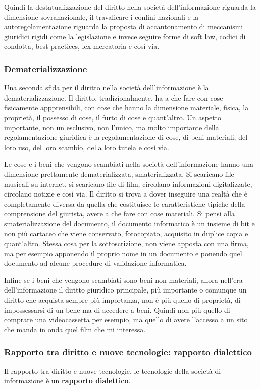 Quindi la destatualizzazione del diritto nella società dell'informazione riguarda la dimensione sovranazionale, il travalicare i confini nazionali e la autoregolamentazione riguarda la proposta di accantonamento di meccanismi giuridici rigidi come la legislazione e invece seguire forme di soft law, codici di condotta, best practices, lex mercatoria e così via.

\subsubsection{Dematerializzazione}
Una seconda sfida per il diritto nella società dell'informazione è la dematerializzazione. 
Il diritto, tradizionalmente, ha a che fare con cose fisicamente appprensibili, con cose che hanno la dimensione materiale, fisica, la proprietà, il possesso di cose, il furto di cose e quant'altro. Un aspetto importante, non un esclusivo, non l'unico, ma molto importante della regolamentazione giuridica è la regolamentazione di cose, di beni materiali, del loro uso, del loro scambio, della loro tutela e così via. 

Le cose e i beni che vengono scambiati nella società dell'informazione hanno una dimensione prettamente dematerializzata, smaterializzata. Si scaricano file musicali su internet, si scaricano file di film, circolano informazioni digitalizzate, circolano notizie e così via. Il diritto si trova a dover inseguire una realtà che è completamente diversa da quella che costituisce le caratteristiche tipiche della comprensione del giurista, avere a che fare con cose materiali. Si pensi alla smaterializzazione del documento, il documento informatico è un insieme di bit e non più cartaceo che viene conservato, fotocopiato, acquisito in duplice copia e quant'altro. Stessa cosa per la sottoscrizione, non viene apposta con una firma, ma per esempio apponendo il proprio nome in un documento e ponendo quel documento ad alcune procedure di validazione informatica. 

Infine se i beni che vengono scambiati sono beni non materiali, allora nell'era dell'informazione il diritto giuridico principale, più importante o comunque un diritto che acquista sempre più importanza, non è più quello di proprietà, di impossessarsi di un bene ma di accedere a beni. Quindi non più quello di comprare una videocassetta per esempio, ma quello di avere l'accesso a un sito che manda in onda quel film che mi interessa.

\subsubsection{Rapporto tra diritto e nuove tecnologie: rapporto dialettico}
Il rapporto tra diritto e nuove tecnologie, le tecnologie della società di informazione è un \textbf{rapporto dialettico}. 

